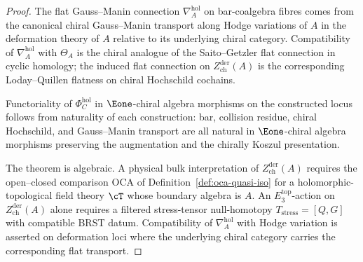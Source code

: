 \begin{proof}
The flat Gauss--Manin connection $\nabla_A^{\mathrm{hol}}$ on bar-coalgebra fibres comes from the canonical chiral Gauss--Manin transport along Hodge variations of $A$ in the deformation theory of $A$ relative to its underlying chiral category. Compatibility of $\nabla_A^{\mathrm{hol}}$ with $\Theta_A$ is the chiral analogue of the Saito--Getzler flat connection in cyclic homology; the induced flat connection on $Z^{\mathrm{der}}_{\mathrm{ch}}(A)$ is the corresponding Loday--Quillen flatness on chiral Hochschild cochains.

Functoriality of $\Phi^{\mathrm{hol}}_C$ in $\Eone$-chiral algebra morphisms on the constructed locus follows from naturality of each construction: bar, collision residue, chiral Hochschild, and Gauss--Manin transport are all natural in $\Eone$-chiral algebra morphisms preserving the augmentation and the chirally Koszul presentation.

The theorem is algebraic. A physical bulk interpretation of $Z^{\mathrm{der}}_{\mathrm{ch}}(A)$ requires the open--closed comparison $\mathrm{OCA}$ of Definition~\ref{def:oca-quasi-iso} for a holomorphic-topological field theory $\cT$ whose boundary algebra is $A$. An $E_3^{\mathrm{top}}$-action on $Z^{\mathrm{der}}_{\mathrm{ch}}(A)$ alone requires a filtered stress-tensor null-homotopy $T_{\mathrm{stress}}=[Q,G]$ with compatible BRST datum. Compatibility of $\nabla_A^{\mathrm{hol}}$ with Hodge variation is asserted on deformation loci where the underlying chiral category carries the corresponding flat transport.
\end{proof}

